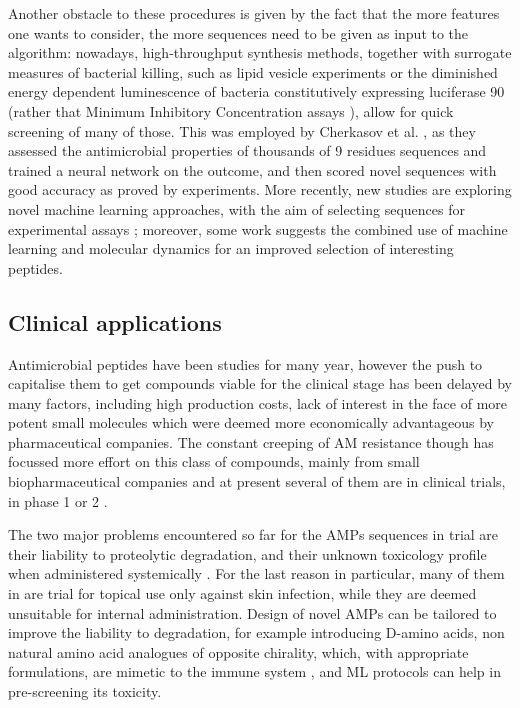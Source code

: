 Another obstacle to these procedures is given by the fact that the more features one wants to consider, the more sequences need to be given as input to the algorithm: nowadays, high-throughput synthesis methods, together with surrogate measures of bacterial killing, such as lipid vesicle experiments \cite{Wimley2010} or the diminished energy ­dependent luminescence of bacteria constitutively expressing luciferase 90 (rather that Minimum Inhibitory Concentration assays \cite{Lewenza2005}), allow for quick screening of many of those.
%
This was employed by Cherkasov et al. \cite{Cherkasov2009}, as they assessed the antimicrobial properties of thousands of 9 residues sequences and trained a neural network on the outcome, and then scored novel sequences with good accuracy as proved by experiments.
More recently, new studies are exploring novel machine learning approaches, with the aim of selecting sequences for experimental assays \cite{Lee2017}; moreover, some work suggests the combined use of machine learning and molecular dynamics for an improved selection of interesting peptides.


\subsection{Clinical applications}
Antimicrobial peptides have been studies for many year, however the push to capitalise them to get compounds viable for the clinical stage has been delayed by many factors, including high production costs, lack of interest in the face of more potent small molecules which were deemed more economically advantageous by pharmaceutical companies.
%
The constant creeping of AM resistance though has focussed more effort on this class of compounds, mainly from small biopharmaceutical companies and at present several of them are in clinical trials, in phase 1 or 2 \cite{Naafs2018}.

The two major problems encountered so far for the AMPs sequences in trial are their liability to proteolytic degradation, and their unknown toxicology profile when administered systemically \cite{2_fjell}. For the last reason in particular, many of them in are trial for topical use only against skin infection, while they are deemed unsuitable for internal administration.
%
Design of novel AMPs can be tailored to improve the liability to degradation, for example introducing D-amino acids, non ­natural amino ­acid analogues of opposite chirality, which, with appropriate formulations, are mimetic to the immune system \cite{160,161_fjell}, and ML protocols can help in pre-screening its toxicity. 

